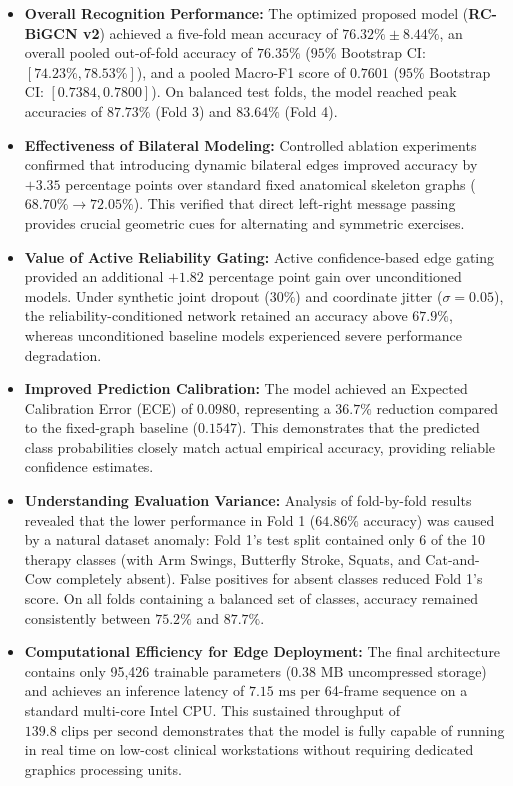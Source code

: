\begin{itemize}
    \item \textbf{Overall Recognition Performance:} The optimized proposed model (\textbf{RC-BiGCN v2}) achieved a five-fold mean accuracy of $76.32\% \pm 8.44\%$, an overall pooled out-of-fold accuracy of $76.35\%$ ($95\%$ Bootstrap CI: $[74.23\%, 78.53\%]$), and a pooled Macro-F1 score of $0.7601$ ($95\%$ Bootstrap CI: $[0.7384, 0.7800]$). On balanced test folds, the model reached peak accuracies of $87.73\%$ (Fold 3) and $83.64\%$ (Fold 4).
    \item \textbf{Effectiveness of Bilateral Modeling:} Controlled ablation experiments confirmed that introducing dynamic bilateral edges improved accuracy by $+3.35$ percentage points over standard fixed anatomical skeleton graphs ($68.70\% \rightarrow 72.05\%$). This verified that direct left-right message passing provides crucial geometric cues for alternating and symmetric exercises.
    \item \textbf{Value of Active Reliability Gating:} Active confidence-based edge gating provided an additional $+1.82$ percentage point gain over unconditioned models. Under synthetic joint dropout ($30\%$) and coordinate jitter ($\sigma = 0.05$), the reliability-conditioned network retained an accuracy above $67.9\%$, whereas unconditioned baseline models experienced severe performance degradation.
    \item \textbf{Improved Prediction Calibration:} The model achieved an Expected Calibration Error (ECE) of $0.0980$, representing a $36.7\%$ reduction compared to the fixed-graph baseline ($0.1547$). This demonstrates that the predicted class probabilities closely match actual empirical accuracy, providing reliable confidence estimates.
    \item \textbf{Understanding Evaluation Variance:} Analysis of fold-by-fold results revealed that the lower performance in Fold 1 ($64.86\%$ accuracy) was caused by a natural dataset anomaly: Fold 1’s test split contained only 6 of the 10 therapy classes (with Arm Swings, Butterfly Stroke, Squats, and Cat-and-Cow completely absent). False positives for absent classes reduced Fold 1's score. On all folds containing a balanced set of classes, accuracy remained consistently between $75.2\%$ and $87.7\%$.
    \item \textbf{Computational Efficiency for Edge Deployment:} The final architecture contains only 95,426 trainable parameters ($0.38\text{ MB}$ uncompressed storage) and achieves an inference latency of $7.15\text{ ms}$ per 64-frame sequence on a standard multi-core Intel CPU. This sustained throughput of $139.8\text{ clips per second}$ demonstrates that the model is fully capable of running in real time on low-cost clinical workstations without requiring dedicated graphics processing units.
\end{itemize}

